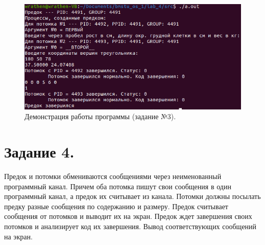 \documentclass[12pt]{report}
\begin{document}
	\begin{figure}[H]
	
		\centering
		
		\includegraphics[width=\linewidth]{img/task_03.png}
		\caption{Демонстрация работы программы (задание №3).}
		
		\label{fig:task_03}
	
	\end{figure}

	\section*{Задание 4.}
	Предок и потомки обмениваются сообщениями через неименованный программный канал.
	Причем оба потомка пишут свои сообщения в один программный канал, а предок их считывает из канала.
	Потомки должны посылать предку разные сообщения по содержанию и размеру.
	Предок считывает сообщения от потомков и выводит их на экран.
	Предок ждет завершения своих потомков и анализирует код их завершения.
	Вывод соответствующих сообщений на экран.
\end{document}
